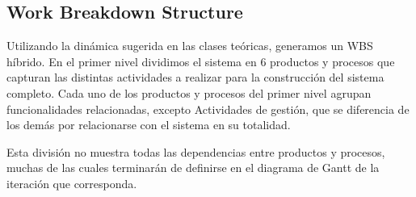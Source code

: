 \subsection{Work Breakdown Structure} 

Utilizando la dinámica sugerida en las clases teóricas, generamos un WBS híbrido. En el primer nivel dividimos el sistema en 6 productos y procesos que capturan las distintas actividades a realizar para la construcción del sistema completo. Cada uno de los productos y procesos del primer nivel agrupan funcionalidades relacionadas, excepto Actividades de gestión, que se diferencia de los demás por relacionarse con el sistema en su totalidad.

Esta división no muestra todas las dependencias entre productos y procesos, muchas de las cuales terminarán de definirse en el diagrama de Gantt de la iteración que corresponda.
\\ \par

